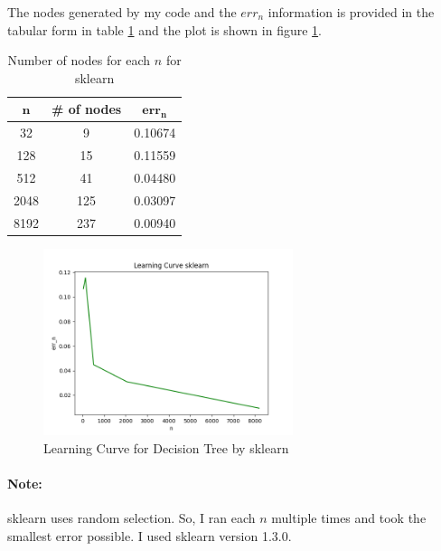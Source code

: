 \documentclass[a4paper]{article}
\theoremstyle{definition}
\newenvironment{soln}{
    \leavevmode\color{blue}\ignorespaces
}{}
\begin{document}
\begin{soln}
      The nodes generated by my code and the $err_n$ information is provided in the tabular form in table \ref{tab:3} and the plot is shown in figure \ref{fig:8}.

      \begin{table}[H]
          \centering
          \begin{tabular}{|c|c|c|}
              \hline
              $\mathbf{n}$ & \textbf{\# of nodes} & $\mathbf{err_n}$ \\
              \hline
              32 & 9 & 0.10674 \\
              \hline
              128 & 15 & 0.11559 \\
              \hline
              512 & 41 & 0.04480 \\
              \hline
              2048 & 125 & 0.03097 \\
              \hline
              8192 & 237 & 0.00940 \\
              \hline
          \end{tabular}
          \caption{Number of nodes for each $n$ for \textsf{sklearn}}
          \label{tab:3}
      \end{table}

    \begin{figure}[H]
        \centering
        \includegraphics[width=0.65\textwidth]{err_n_sklearn.png}
        \caption{Learning Curve for Decision Tree by \textsf{sklearn}}
        \label{fig:8}
    \end{figure}

    \paragraph{Note:} \textsf{sklearn} uses random selection. So, I ran each $n$ multiple times and took the smallest error possible. I used \textsf{sklearn} version 1.3.0.
  \end{soln}
\end{document}
